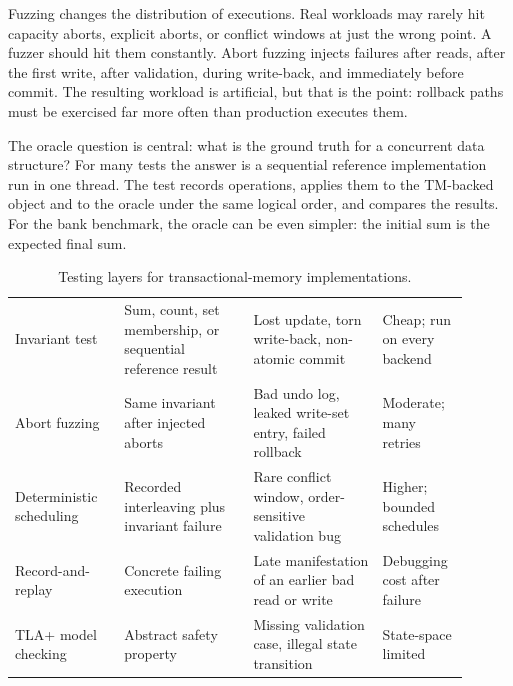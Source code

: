 Fuzzing changes the distribution of executions. Real workloads may rarely hit capacity aborts, explicit aborts, or conflict windows at just the wrong point. A fuzzer should hit them constantly. Abort fuzzing injects failures after reads, after the first write, after validation, during write-back, and immediately before commit. The resulting workload is artificial, but that is the point: rollback paths must be exercised far more often than production executes them.

The oracle question is central: what is the ground truth for a concurrent data structure? For many tests the answer is a sequential reference implementation run in one thread. The test records operations, applies them to the TM-backed object and to the oracle under the same logical order, and compares the results. For the bank benchmark, the oracle can be even simpler: the initial sum is the expected final sum.

\begin{table}[htbp]
\centering
\caption{Testing layers for transactional-memory implementations.}
\label{tab:tm-testing-layers}
\begin{tabular}{M{0.22\linewidth}M{0.26\linewidth}M{0.26\linewidth}M{0.16\linewidth}}
\hline
{} &  &  &  \\
\hline
Invariant test & Sum, count, set membership, or sequential reference result & Lost update, torn write-back, non-atomic commit & Cheap; run on every backend \\
Abort fuzzing & Same invariant after injected aborts & Bad undo log, leaked write-set entry, failed rollback & Moderate; many retries \\
Deterministic scheduling & Recorded interleaving plus invariant failure & Rare conflict window, order-sensitive validation bug & Higher; bounded schedules \\
Record-and-replay & Concrete failing execution & Late manifestation of an earlier bad read or write & Debugging cost after failure \\
TLA+ model checking & Abstract safety property & Missing validation case, illegal state transition & State-space limited \\
\hline
\end{tabular}
\end{table}


